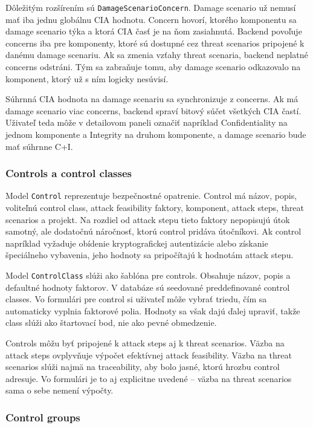 \documentclass[11pt]{article}
\begin{document}
Dôležitým rozšírením sú \texttt{DamageScenarioConcern}. Damage scenario už nemusí mať iba jednu globálnu CIA hodnotu. Concern hovorí, ktorého komponentu sa damage scenario týka a ktorá CIA časť je na ňom zasiahnutá. Backend povoľuje concerns iba pre komponenty, ktoré sú dostupné cez threat scenarios pripojené k danému damage scenariu. Ak sa zmenia vzťahy threat scenaria, backend neplatné concerns odstráni. Tým sa zabraňuje tomu, aby damage scenario odkazovalo na komponent, ktorý už s ním logicky nesúvisí.

Súhrnná CIA hodnota na damage scenariu sa synchronizuje z concerns. Ak má damage scenario viac concerns, backend spraví bitový súčet všetkých CIA častí. Uživateľ teda môže v detailovom paneli označiť napríklad Confidentiality na jednom komponente a Integrity na druhom komponente, a damage scenario bude mať súhrnne C+I.

\subsubsection{Controls a control classes}

Model \texttt{Control} reprezentuje bezpečnostné opatrenie. Control má názov, popis, voliteľnú control class, attack feasibility faktory, komponent, attack steps, threat scenarios a projekt. Na rozdiel od attack stepu tieto faktory nepopisujú útok samotný, ale dodatočnú náročnosť, ktorú control pridáva útočníkovi. Ak control napríklad vyžaduje obídenie kryptografickej autentizácie alebo získanie špeciálneho vybavenia, jeho hodnoty sa pripočítajú k hodnotám attack stepu.

Model \texttt{ControlClass} slúži ako šablóna pre controls. Obsahuje názov, popis a defaultné hodnoty faktorov. V databáze sú seedované preddefinované control classes. Vo formulári pre control si uživateľ môže vybrať triedu, čím sa automaticky vyplnia faktorové polia. Hodnoty sa však dajú ďalej upraviť, takže class slúži ako štartovací bod, nie ako pevné obmedzenie.

Controls môžu byť pripojené k attack steps aj k threat scenarios. Väzba na attack steps ovplyvňuje výpočet efektívnej attack feasibility. Väzba na threat scenarios slúži najmä na traceability, aby bolo jasné, ktorú hrozbu control adresuje. Vo formulári je to aj explicitne uvedené -- väzba na threat scenarios sama o sebe nemení výpočty.

\subsubsection{Control groups}
\end{document}

